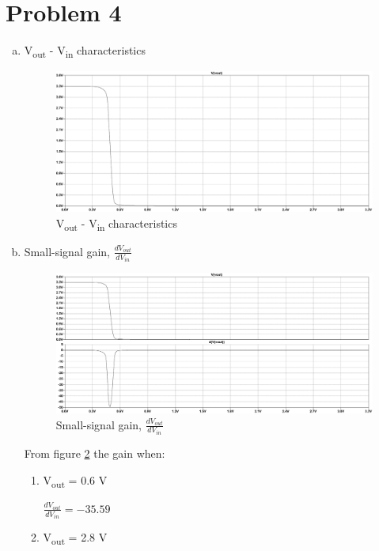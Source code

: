 \documentclass{article}
\begin{document}
\section{Problem 4}
\label{sec:org780a0ad}
\begin{enumerate}[(a)]
\item V\textsubscript{out} - V\textsubscript{in} characteristics
\begin{figure}[H]
\centering
\includegraphics[width=.9\linewidth]{img/q4/a.pdf}
\caption{\label{fig:vout-q4}V\textsubscript{out} - V\textsubscript{in} characteristics}
\end{figure}
\item Small-signal gain, \(\frac{dV_{out}}{dV_{in}}\)
\begin{figure}[H]
\centering
\includegraphics[width=.9\linewidth]{img/q4/b.pdf}
\caption{\label{fig:dvout-q4}Small-signal gain, \(\frac{dV_{out}}{dV_{in}}\)}
\end{figure}

From figure \ref{fig:dvout-q4} the gain when:
\begin{enumerate}[1.]
\item V\textsubscript{out} = 0.6 V

\(\frac{dV_{out}}{dV_{in}} = -35.59\)
\item V\textsubscript{out} = 2.8 V


\end{enumerate}
\end{enumerate}
\end{document}
